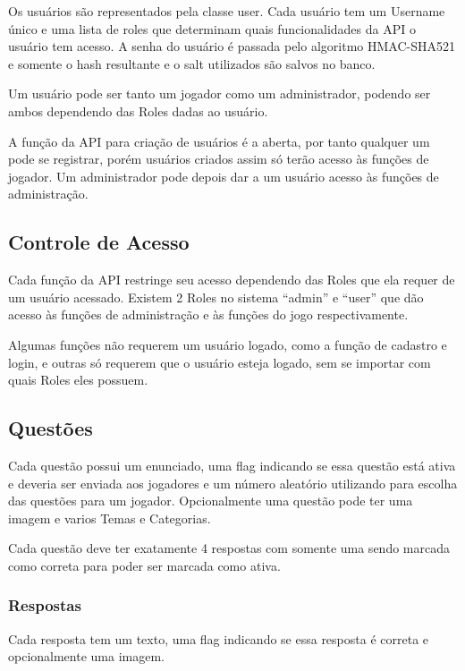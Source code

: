 Os usuários são representados pela classe user. Cada usuário tem um Username único e uma lista de roles que determinam quais funcionalidades da API o usuário tem acesso. A senha do usuário é passada pelo algoritmo HMAC-SHA521 e somente o hash resultante e o salt utilizados são salvos no banco.

Um usuário pode ser tanto um jogador como um administrador, podendo ser ambos dependendo das Roles dadas ao usuário. 

A função da API para criação de usuários é a aberta, por tanto qualquer um pode se registrar, porém usuários criados assim só terão acesso às funções de jogador. Um administrador pode depois dar a um usuário acesso às funções de administração.

\subsection{Controle de Acesso}
\label{subsec:acesso}

Cada função da API restringe seu acesso dependendo das Roles que ela requer de um usuário acessado. Existem 2 Roles no sistema “admin” e “user” que dão acesso às funções de administração e às funções do jogo respectivamente.

Algumas funções não requerem um usuário logado, como a função de cadastro e login, e outras só requerem que o usuário esteja logado, sem se importar com quais Roles eles possuem.

\subsection{Questões}
\label{subsec:questoes}

Cada questão possui um enunciado, uma flag indicando se essa questão está ativa e deveria ser enviada aos jogadores e um número aleatório utilizando para escolha das questões para um jogador. Opcionalmente uma questão pode ter uma imagem e varios Temas e Categorias. 

Cada questão deve ter exatamente 4 respostas com somente uma sendo marcada como correta para poder ser marcada como ativa. 

\subsubsection{Respostas}
\label{subsubsec:respostas}

Cada resposta tem um texto, uma flag indicando se essa resposta é correta e opcionalmente uma imagem. 

